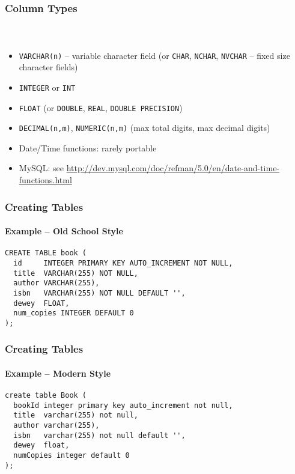 \documentclass{beamer}
\begin{document}
\begin{frame}
  \frametitle{Column Types}
  \framesubtitle{~}

\begin{itemize}
  \item \texttt{VARCHAR(n)}  -- variable character field (or \texttt{CHAR}, \texttt{NCHAR}, \texttt{NVCHAR} -- fixed size character fields)
  \item \texttt{INTEGER} or \texttt{INT}
  \item \texttt{FLOAT} (or \texttt{DOUBLE}, \texttt{REAL}, \texttt{DOUBLE PRECISION})
  \item \texttt{DECIMAL(n,m)}, \texttt{NUMERIC(n,m)} (max total digits, max decimal digits)
  \item Date/Time functions: rarely portable
  \item MySQL: see \url{http://dev.mysql.com/doc/refman/5.0/en/date-and-time-functions.html}
\end{itemize}

\end{frame}

\begin{frame}[fragile]
  \frametitle{Creating Tables}
  \framesubtitle{Example -- Old School Style}

\begin{verbatim}
CREATE TABLE book (
  id     INTEGER PRIMARY KEY AUTO_INCREMENT NOT NULL,
  title  VARCHAR(255) NOT NULL,
  author VARCHAR(255),
  isbn   VARCHAR(255) NOT NULL DEFAULT '',
  dewey  FLOAT,
  num_copies INTEGER DEFAULT 0
);
\end{verbatim}

\end{frame}

\begin{frame}[fragile]
  \frametitle{Creating Tables}
  \framesubtitle{Example -- Modern Style}

\begin{verbatim}
create table Book (
  bookId integer primary key auto_increment not null,
  title  varchar(255) not null,
  author varchar(255),
  isbn   varchar(255) not null default '',
  dewey  float,
  numCopies integer default 0
);
\end{verbatim}

\end{frame}
\end{document}
